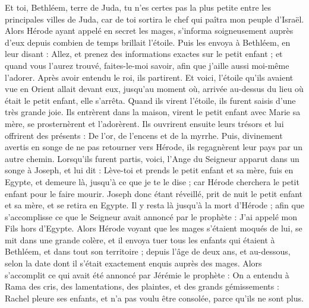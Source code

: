 \begin{multicols}{2}
Et toi, Bethléem, terre de Juda, tu n'es certes pas la plus petite entre les principales villes de Juda, car de toi sortira le chef qui paîtra mon peuple d'Israël{}.
Alors Hérode ayant appelé en secret les mages, s'informa soigneusement auprès d’eux depuis combien de temps brillait l'étoile.
Puis les envoya à Bethléem, en leur disant : Allez, et prenez des informations exactes sur le petit enfant ; et quand vous l'aurez trouvé, faites-le-moi savoir, afin que j’aille aussi moi-même l’adorer.
Après avoir entendu le roi, ils partirent. Et voici, l'étoile{} qu'ils avaient vue en Orient allait devant eux, jusqu’au moment où, arrivée au-dessus du lieu où était le petit enfant, elle s’arrêta.
Quand ils virent l'étoile, ils furent saisis d’une très grande joie.
Ils entrèrent dans la maison, virent le petit enfant avec Marie sa mère, se prosternèrent et l’adorèrent. Ils ouvrirent ensuite leurs trésors et lui offrirent des présents : De l'or, de l'encens et de la myrrhe.
Puis, divinement avertis en songe de ne pas retourner vers Hérode, ils regagnèrent leur pays par un autre chemin.
Lorsqu’ils furent partis, voici, l’Ange du Seigneur apparut dans un songe à Joseph, et lui dit : Lève-toi et prends le petit enfant et sa mère, fuis en Egypte, et demeure là, jusqu'à ce que je te le dise ; car Hérode cherchera le petit enfant pour le faire mourir.
Joseph donc étant réveillé, prit de nuit le petit enfant et sa mère, et se retira en Egypte.
Il y resta là jusqu’à la mort d'Hérode ; afin que s’accomplisse ce que le Seigneur avait annoncé par le prophète : J'ai appelé mon Fils hors d'Egypte{}.
Alors Hérode voyant que les mages s'étaient moqués de lui, se mit dans une grande colère, et il envoya tuer tous les enfants qui étaient à Bethléem, et dans tout son territoire ; depuis l'âge de deux ans, et au-dessous, selon la date dont il s'était exactement enquis auprès des mages.
Alors s’accomplit ce qui avait été annoncé par Jérémie le prophète :
On a entendu à Rama des cris, des lamentations, des plaintes, et des grands gémissements : Rachel pleure ses enfants, et n’a pas voulu être consolée, parce qu’ils ne sont plus{}.

\end{multicols}
